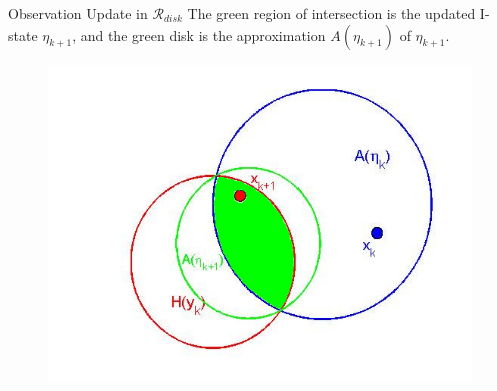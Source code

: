 \documentclass[10pt]{beamer}
\begin{document}
\begin{frame}{Observation Update in $\mathcal{R}_{disk}$}
  The green region of intersection is the updated I-state $\eta_{k+1}$, and the
  green disk is the approximation $A(\eta_{k+1})$ of $\eta_{k+1}$.
			
    \begin{figure}
    \includegraphics[scale=0.3]{figs/circle3_2.jpg}
    \end{figure}
 
\end{frame}
\end{document}
